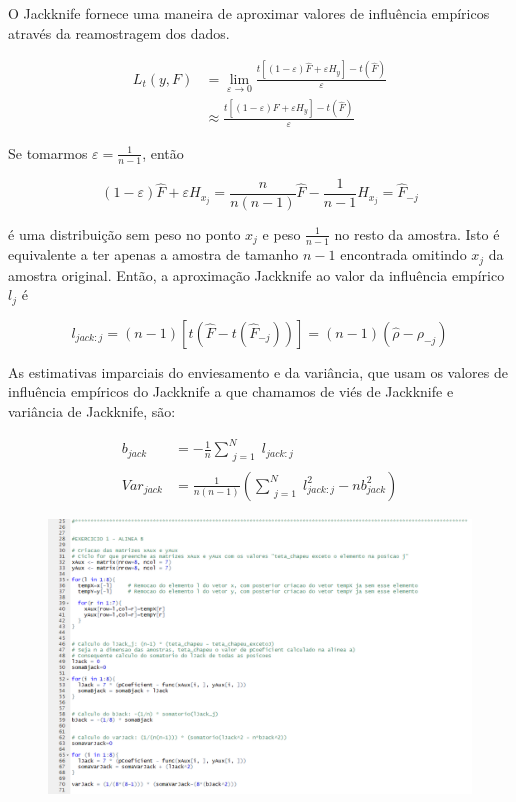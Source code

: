 \documentclass{article}
\begin{document}
\begin{enumerate}[(a)]
						O Jackknife fornece uma maneira de aproximar valores de influência empíricos através da reamostragem dos dados.
						
						\begin{align*}
							L_t(y,F) &= \lim_{\varepsilon \to 0} 
							\frac{t\left[(1 - \varepsilon)\hat{F} + \varepsilon H_y \right] 
							- t(\hat{F})}{\varepsilon}\\
							&\approx  
							\frac{t\left[(1 - \varepsilon)\hat{F} + \varepsilon H_y \right] 
							- t(\hat{F})}{\varepsilon} 
						\end{align*}		 			
						
						Se tomarmos $\varepsilon = \frac{1}{n-1}$, então
						
						\begin{equation*}
							(1 - \varepsilon)\hat{F} + \varepsilon H_{x_j} 
							= \frac{n}{n(n-1)}\hat{F} - \frac{1}{n-1}H_{x_j} = \hat{F}_{-j}
						\end{equation*}
						
						é uma distribuição sem peso no ponto $x_j$ e peso $\frac{1}{n-1}$ no resto da amostra.
						Isto é equivalente a ter apenas a amostra de tamanho $n-1$ encontrada omitindo $x_j$ da amostra original.
						Então, a aproximação Jackknife ao valor da influência empírico $l_j$ é
						
						\begin{equation*}
							l_{jack:j} = (n-1)[t(\hat{F}-t(\hat{F}_{-j}))] = 
							(n-1)(\hat{\rho}-\rho_{-j})
						\end{equation*}
						
						As estimativas imparciais do enviesamento e da variância, que usam os valores de influência empíricos do Jackknife a que chamamos de viés de Jackknife e variância de Jackknife, são:
						
						\begin{align*}
							b_{jack} &= -\frac{1}{n}\sum_{\substack{j=1}}^{N}l_{jack:j}\\
							Var_{jack} &= \frac{1}{n(n-1)}
							(\sum_{\substack{j=1}}^{N}l^2_{jack:j} - nb^2_{jack})
						\end{align*}	

\newpage

						\begin{figure}[!h]
							\includegraphics[scale=0.4]{ex1b)}
						\end{figure}


\end{enumerate}
\end{document}
